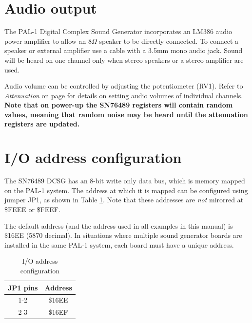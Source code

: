 \documentclass[a4paper,11pt,twoside,openright]{report}
\begin{document}

\section*{Audio output}
The PAL-1 Digital Complex Sound Generator incorporates an LM386 audio power amplifier to allow an 
$8\Omega$ speaker to be directly connected. To connect a speaker or external amplifier use a cable 
with a 3.5mm mono audio jack. Sound will be heard on one channel only when stereo speakers or
a stereo amplifier are used.   

Audio volume can be controlled by adjusting the potentiometer (RV1). Refer to \textit{Attenuation}
on page \pageref{sec:attenuation} for details on setting audio volumes of individual channels.
\textbf{Note that on power-up the SN76489 registers will contain random values, meaning that random
noise may be heard until the attenuation registers are updated.}

\section*{I/O address configuration}
\label{sec:configuration}
The SN76489 DCSG has an 8-bit write only data bus, which is memory mapped on the PAL-1 system. The   
address at which it is mapped can be configured using jumper JP1, as shown in Table \ref{tab:addresses}.
Note that these addresses are \textit{not} mirorred at \$FEEE or \$FEEF.

The default address (and the address used in all examples in this manual) is \$16EE (5870 decimal). 
In situations where multiple sound generator boards are installed in the same PAL-1 system, each 
board must have a unique address. 

\begin{table}[h]
\centering
\begin{tabular}{c | c}
JP1 pins & Address \\ \hline
1-2 & \$16EE \\
2-3 & \$16EF
\end{tabular}
\caption[]{I/O address configuration}
\label{tab:addresses}
\end{table}
\end{document}
